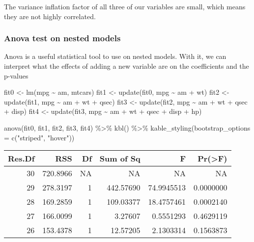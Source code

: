 \documentclass[
]{article}
\newenvironment{Shaded}{\begin{snugshade}}{\end{snugshade}}
\newcommand{\AttributeTok}[1]{\textcolor[rgb]{0.77,0.63,0.00}{#1}}
\newcommand{\FunctionTok}[1]{\textcolor[rgb]{0.00,0.00,0.00}{#1}}
\newcommand{\NormalTok}[1]{#1}
\newcommand{\OtherTok}[1]{\textcolor[rgb]{0.56,0.35,0.01}{#1}}
\newcommand{\SpecialCharTok}[1]{\textcolor[rgb]{0.00,0.00,0.00}{#1}}
\newcommand{\StringTok}[1]{\textcolor[rgb]{0.31,0.60,0.02}{#1}}
\begin{document}
The variance inflation factor of all three of our variables are small,
which means they are not highly correlated.

\hypertarget{anova-test-on-nested-models}{%
\subsubsection{Anova test on nested
models}\label{anova-test-on-nested-models}}

Anova is a useful statistical tool to use on nested models. With it, we
can interpret what the effects of adding a new variable are on the
coefficients and the p-values

\begin{Shaded}
\begin{Highlighting}[]
\NormalTok{fit0 }\OtherTok{\textless{}{-}} \FunctionTok{lm}\NormalTok{(mpg }\SpecialCharTok{\textasciitilde{}}\NormalTok{ am, mtcars)}
\NormalTok{fit1 }\OtherTok{\textless{}{-}} \FunctionTok{update}\NormalTok{(fit0, mpg }\SpecialCharTok{\textasciitilde{}}\NormalTok{ am }\SpecialCharTok{+}\NormalTok{ wt)}
\NormalTok{fit2 }\OtherTok{\textless{}{-}} \FunctionTok{update}\NormalTok{(fit1, mpg }\SpecialCharTok{\textasciitilde{}}\NormalTok{ am }\SpecialCharTok{+}\NormalTok{ wt }\SpecialCharTok{+}\NormalTok{ qsec)}
\NormalTok{fit3 }\OtherTok{\textless{}{-}} \FunctionTok{update}\NormalTok{(fit2, mpg }\SpecialCharTok{\textasciitilde{}}\NormalTok{ am }\SpecialCharTok{+}\NormalTok{ wt }\SpecialCharTok{+}\NormalTok{ qsec }\SpecialCharTok{+}\NormalTok{ disp)}
\NormalTok{fit4 }\OtherTok{\textless{}{-}} \FunctionTok{update}\NormalTok{(fit3, mpg }\SpecialCharTok{\textasciitilde{}}\NormalTok{ am }\SpecialCharTok{+}\NormalTok{ wt }\SpecialCharTok{+}\NormalTok{ qsec }\SpecialCharTok{+}\NormalTok{ disp }\SpecialCharTok{+}\NormalTok{ hp)}

\FunctionTok{anova}\NormalTok{(fit0, fit1, fit2, fit3, fit4)  }\SpecialCharTok{\%\textgreater{}\%}
  \FunctionTok{kbl}\NormalTok{() }\SpecialCharTok{\%\textgreater{}\%}
  \FunctionTok{kable\_styling}\NormalTok{(}\AttributeTok{bootstrap\_options =} \FunctionTok{c}\NormalTok{(}\StringTok{"striped"}\NormalTok{, }\StringTok{"hover"}\NormalTok{))}
\end{Highlighting}
\end{Shaded}

\begin{table}
\centering
\begin{tabular}[t]{r|r|r|r|r|r}
\hline
Res.Df & RSS & Df & Sum of Sq & F & Pr(>F)\\
\hline
30 & 720.8966 & NA & NA & NA & NA\\
\hline
29 & 278.3197 & 1 & 442.57690 & 74.9945513 & 0.0000000\\
\hline
28 & 169.2859 & 1 & 109.03377 & 18.4757461 & 0.0002140\\
\hline
27 & 166.0099 & 1 & 3.27607 & 0.5551293 & 0.4629119\\
\hline
26 & 153.4378 & 1 & 12.57205 & 2.1303314 & 0.1563873\\
\hline
\end{tabular}
\end{table}
\end{document}
